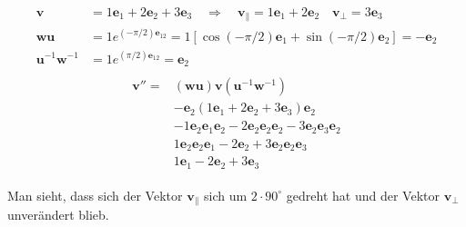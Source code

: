 \begin{beispiel}
	\begin{align}
		\begin{split}
			\mathbf{v} &= 1\mathbf{e}_1 + 2\mathbf{e}_2 + 3\mathbf{e}_3\quad\Rightarrow\quad \mathbf{v_\parallel} = 1\mathbf{e}_1 + 2\mathbf{e}_2 \quad \mathbf{v_\perp} = 3\mathbf{e}_3\\ 
			\mathbf{wu} &= 1e^{(-\pi/2) \mathbf{e}_{12}} = 1[\cos(-\pi/2)\mathbf{e}_1+\sin(-\pi/2)\mathbf{e}_2] = -\mathbf{e}_2 \\
			\mathbf{u}^{-1}\mathbf{w}^{-1} &= 1e^{(\pi/2) \mathbf{e}_{12}} = \mathbf{e}_2
		\end{split}
	\end{align}
	\begin{align}
		\begin{split}
			\mathbf{v}'' = &(\mathbf{wu})\mathbf{v}(\mathbf{u}^{-1}\mathbf{w}^{-1}) \\ 
			&-\mathbf{e}_2 (1\mathbf{e}_1 + 2\mathbf{e}_2 + 3\mathbf{e}_3) \mathbf{e}_2 \\
			& -1\mathbf{e}_2\mathbf{e}_1\mathbf{e}_2 - 2\mathbf{e}_2\mathbf{e}_2\mathbf{e}_2 - 3\mathbf{e}_2\mathbf{e}_3\mathbf{e}_2 \\
			& 1\mathbf{e}_2\mathbf{e}_2\mathbf{e}_1 - 2\mathbf{e}_2 + 3\mathbf{e}_2\mathbf{e}_2\mathbf{e}_3 \\
			& 1\mathbf{e}_1 - 2\mathbf{e}_2 + 3\mathbf{e}_3
		\end{split}
	\end{align}
\end{beispiel}
Man sieht, dass sich der Vektor $\mathbf{v_\parallel}$ sich um $2\cdot90^\circ$ gedreht hat und der Vektor $\mathbf{v_\perp}$ unverändert blieb.